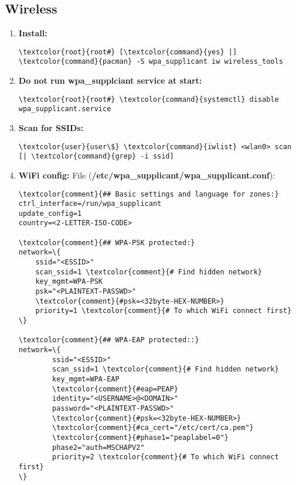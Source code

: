 \documentclass[10pt, a4paper, onecolumn, openany]{book} %
\begin{document}
\subsection{Wireless}
\begin{enumerate}
    \item \textbf{Install:}
\begin{Verbatim}[commandchars=\\\{\}]
\textcolor{root}{root#} [\textcolor{command}{yes} |] \textcolor{command}{pacman} -S wpa_supplicant iw wireless_tools
\end{Verbatim} 
    \item \textbf{Do not run wpa\_supplciant service at start:}
\begin{Verbatim}[commandchars=\\\{\}]
\textcolor{root}{root#} \textcolor{command}{systemctl} disable wpa_supplicant.service
\end{Verbatim} 
    \item \textbf{Scan for SSIDs:}
\begin{Verbatim}[commandchars=\\\{\}]
\textcolor{user}{user\$} \textcolor{command}{iwlist} <wlan0> scan [| \textcolor{command}{grep} -i ssid]
\end{Verbatim}

    \item \textbf{WiFi config:}
\newline File (\textbf{\textcolor{file}{/etc/wpa\_supplicant/wpa\_supplicant.conf}}):
\begin{Verbatim}[commandchars=\\\{\}]
\textcolor{comment}{## Basic settings and language for zones:}
ctrl_interface=/run/wpa_supplicant
update_config=1
country=<2-LETTER-ISO-CODE>

\textcolor{comment}{## WPA-PSK protected:}
network=\{
    ssid="<ESSID>"
    scan_ssid=1 \textcolor{comment}{# Find hidden network}
    key_mgmt=WPA-PSK
    psk="<PLAINTEXT-PASSWD>"
    \textcolor{comment}{#psk=<32byte-HEX-NUMBER>}
    priority=1 \textcolor{comment}{# To which WiFi connect first}
\}

\textcolor{comment}{## WPA-EAP protected::}
network=\{
        ssid="<ESSID>"
        scan_ssid=1 \textcolor{comment}{# Find hidden network}
        key_mgmt=WPA-EAP
        \textcolor{comment}{#eap=PEAP}
        identity="<USERNAME>@<DOMAIN>"
        password="<PLAINTEXT-PASSWD>"
        \textcolor{comment}{#psk=<32byte-HEX-NUMBER>}
        \textcolor{comment}{#ca_cert="/etc/cert/ca.pem"}
        \textcolor{comment}{#phase1="peaplabel=0"}
        phase2="auth=MSCHAPV2"
        priority=2 \textcolor{comment}{# To which WiFi connect first}
\}


\end{Verbatim}
\end{enumerate}
\end{document}
